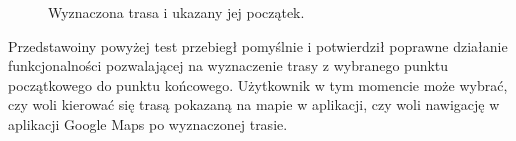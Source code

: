 \setlength{\fboxrule}{0.5pt}
\begin{figure}[H]
    \centering
    \caption{Wyznaczona trasa i ukazany jej początek.}
    \label{test:map5}
\end{figure}

Przedstawoiny powyżej test przebiegł pomyślnie i potwierdził poprawne działanie funkcjonalności pozwalającej na wyznaczenie trasy z wybranego punktu początkowego do punktu końcowego. Użytkownik w tym momencie może wybrać, czy woli kierować się trasą pokazaną na mapie w aplikacji, czy woli nawigację w aplikacji Google Maps po wyznaczonej trasie.



